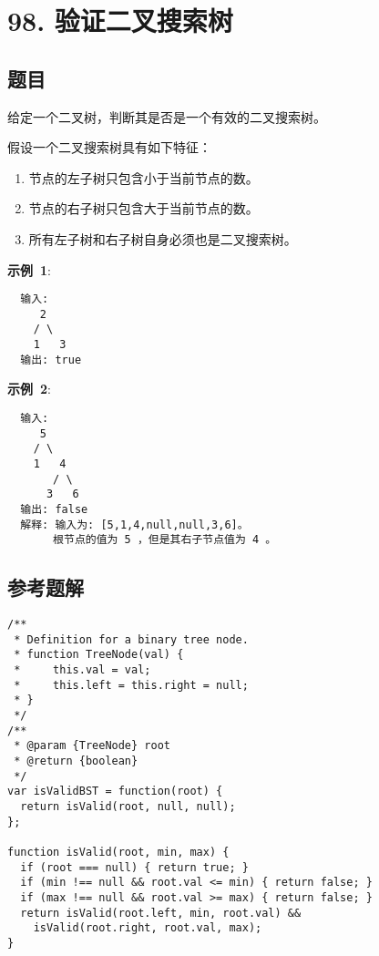 \newpage
\section{98. 验证二叉搜索树}
\label{leetcode:98}

\subsection{题目}

给定一个二叉树，判断其是否是一个有效的二叉搜索树。

假设一个二叉搜索树具有如下特征：

\begin{enumerate}
  \item 节点的左子树只包含小于当前节点的数。
  \item 节点的右子树只包含大于当前节点的数。
  \item 所有左子树和右子树自身必须也是二叉搜索树。
\end{enumerate}

\textbf{示例 1}:

\begin{verbatim}
  输入:
     2
    / \
    1   3
  输出: true
\end{verbatim}

\textbf{示例 2}:

\begin{verbatim}
  输入:
     5
    / \
    1   4
       / \
      3   6
  输出: false
  解释: 输入为: [5,1,4,null,null,3,6]。
       根节点的值为 5 ，但是其右子节点值为 4 。
\end{verbatim}

\subsection{参考题解}

\begin{verbatim}
/**
 * Definition for a binary tree node.
 * function TreeNode(val) {
 *     this.val = val;
 *     this.left = this.right = null;
 * }
 */
/**
 * @param {TreeNode} root
 * @return {boolean}
 */
var isValidBST = function(root) {
  return isValid(root, null, null);
};

function isValid(root, min, max) {
  if (root === null) { return true; }
  if (min !== null && root.val <= min) { return false; }
  if (max !== null && root.val >= max) { return false; }
  return isValid(root.left, min, root.val) &&
    isValid(root.right, root.val, max);
}
\end{verbatim}

